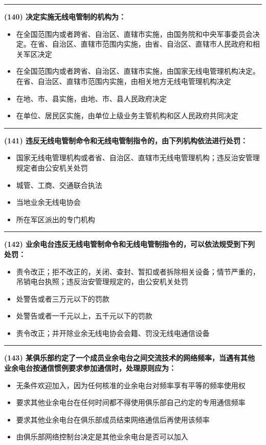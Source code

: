 \documentclass[twocolumn]{ctexart}  %
\begin{document}
\noindent\rule{0.5\textwidth}{1pt}
\heiti \textbf{(140) 决定实施无线电管制的机构为：} \songti {\color{gray} [LK0108] }
\begin{itemize}
	\item  在全国范围内或者跨省、自治区、直辖市实施，由国务院和中央军事委员会决定。在省、自治区、直辖市范围内实施，由省、自治区、直辖市人民政府和相关军区决定
	\item  在全国范围内或者跨省、自治区、直辖市实施，由国家无线电管理机构决定。在省、自治区、直辖市范围内实施，由相关地方无线电管理机构决定
	\item  在地、市、县实施，由地、市、县人民政府决定
	\item  在单位、居民区实施，由单位上级业务主管机构和区人民政府共同决定
\end{itemize}


\noindent\rule{0.5\textwidth}{1pt}
\heiti \textbf{(141) 违反无线电管制命令和无线电管制指令的，由下列机构依法进行处罚：} \songti {\color{gray} [LK0109] }
\begin{itemize}
	\item  国家无线电管理机构或者省、自治区、直辖市无线电管理机构；违反治安管理规定者由公安机关处罚
	\item  城管、工商、交通联合执法
	\item  当地业余无线电协会
	\item  所在军区派出的专门机构
\end{itemize}


\noindent\rule{0.5\textwidth}{1pt}
\heiti \textbf{(142) 业余电台违反无线电管制命令和无线电管制指令的，可以依法规受到下列处罚：} \songti {\color{gray} [LK0110] }
\begin{itemize}
	\item   责令改正；拒不改正的，关闭、查封、暂扣或者拆除相关设备；情节严重的，吊销电台执照；违反治安管理规定的，由公安机关处罚
	\item   处警告或者三万元以下的罚款
	\item   处警告或者一千元以上，五千元以下的罚款 
	\item   责令改正；并开除业余无线电协会会籍、罚没无线电通信设备
\end{itemize}


\noindent\rule{0.5\textwidth}{1pt}
\heiti \textbf{(143) 某俱乐部约定了一个成员业余电台之间交流技术的网络频率，当遇有其他业余电台按通信惯例要求参加通信时，处理原则应为：} \songti {\color{gray} [LK0050] }
\begin{itemize}
	\item  无条件欢迎加入，因为任何核准的业余电台对频率享有平等的频率使用权
	\item  要求其他业余电台在任何时间都不得使用俱乐部自己约定的专用通信频率
	\item  要求其他业余电台在俱乐部成员结束网络通信后再使用该频率
	\item  由俱乐部网络控制台决定是其他业余电台是否可以加入
\end{itemize}
\end{document}

